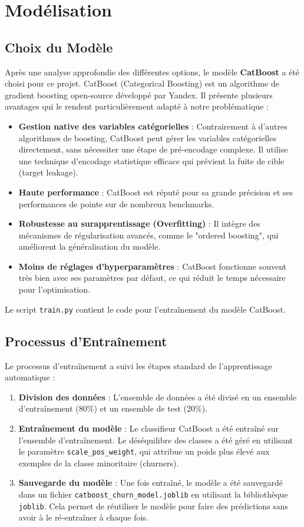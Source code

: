 \chapter{Modélisation}
\minitoc

\section{Choix du Modèle}
Après une analyse approfondie des différentes options, le modèle \textbf{CatBoost} a été choisi pour ce projet. CatBoost (Categorical Boosting) est un algorithme de gradient boosting open-source développé par Yandex. Il présente plusieurs avantages qui le rendent particulièrement adapté à notre problématique :

\begin{itemize}
    \item \textbf{Gestion native des variables catégorielles} : Contrairement à d'autres algorithmes de boosting, CatBoost peut gérer les variables catégorielles directement, sans nécessiter une étape de pré-encodage complexe. Il utilise une technique d'encodage statistique efficace qui prévient la fuite de cible (target leakage).
    \item \textbf{Haute performance} : CatBoost est réputé pour sa grande précision et ses performances de pointe sur de nombreux benchmarks.
    \item \textbf{Robustesse au surapprentissage (Overfitting)} : Il intègre des mécanismes de régularisation avancés, comme le "ordered boosting", qui améliorent la généralisation du modèle.
    \item \textbf{Moins de réglages d'hyperparamètres} : CatBoost fonctionne souvent très bien avec ses paramètres par défaut, ce qui réduit le temps nécessaire pour l'optimisation.
\end{itemize}

Le script \texttt{train.py} contient le code pour l'entraînement du modèle CatBoost.

\section{Processus d'Entraînement}
Le processus d'entraînement a suivi les étapes standard de l'apprentissage automatique :
\begin{enumerate}
    \item \textbf{Division des données} : L'ensemble de données a été divisé en un ensemble d'entraînement (80\%) et un ensemble de test (20\%).
    \item \textbf{Entraînement du modèle} : Le classifieur CatBoost a été entraîné sur l'ensemble d'entraînement. Le déséquilibre des classes a été géré en utilisant le paramètre \texttt{scale\_pos\_weight}, qui attribue un poids plus élevé aux exemples de la classe minoritaire (churners).
    \item \textbf{Sauvegarde du modèle} : Une fois entraîné, le modèle a été sauvegardé dans un fichier \texttt{catboost\_churn\_model.joblib} en utilisant la bibliothèque \texttt{joblib}. Cela permet de réutiliser le modèle pour faire des prédictions sans avoir à le ré-entraîner à chaque fois.
\end{enumerate}

